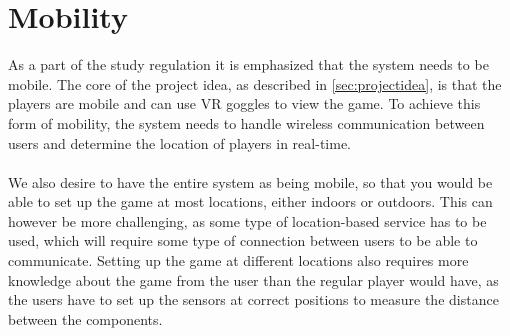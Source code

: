 \section{Mobility}\label{sec:mobility}
As a part of the study regulation it is emphasized that the system needs to be mobile.
The core of the project idea, as described in \autoref{sec:projectidea}, is that the players are mobile and can use VR goggles to view the game.
To achieve this form of mobility, the system needs to handle wireless communication between users and determine the location of players in real-time.
\\\\
We also desire to have the entire system as being mobile, so that you would be able to set up the game at most locations, either indoors or outdoors.
This can however be more challenging, as some type of location-based service has to be used, which will require some type of connection between users to be able to communicate.
Setting up the game at different locations also requires more knowledge about the game from the user than the regular player would have, as the users have to set up the sensors at correct positions to measure the distance between the components.